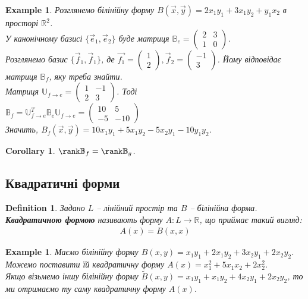 \documentclass[a4paper, 10pt]{article}
\theoremstyle{theoremdd}
\newtheorem{definition}[theorem]{Definition}
\newtheorem{example}[theorem]{Example}
\newtheorem{corollary}[theorem]{Corollary}
\begin{document}
\begin{example}
Розглянемо білінійну форму $B(\vec{x},\vec{y}) = 2x_1y_1 + 3x_1y_2 + y_1x_2$ в просторі $\mathbb{R}^2$.\\
У канонічному базисі $\{\vec{e}_1,\vec{e}_2\}$ буде матриця $\mathbb{B}_e = \begin{pmatrix}
2 & 3 \\
1 & 0
\end{pmatrix}$.\\
Розглянемо базис $\{ \vec{f}_1, \vec{f}_1 \}$, де $\vec{f_1} = \begin{pmatrix}
1 \\ 2
\end{pmatrix}, \vec{f}_2 = \begin{pmatrix}
-1 \\ 3
\end{pmatrix}$. Йому відповідає матриця $\mathbb{B}_f$, яку треба знайти.\\
Матриця $\mathbb{U}_{f \to e} = \begin{pmatrix}
1 & -1 \\
2 & 3
\end{pmatrix}$. Тоді\\
$\mathbb{B}_f = \mathbb{U}^T_{f \to e} \mathbb{B}_e \mathbb{U}_{f \to e} = \begin{pmatrix}
10 & 5 \\
-5 & -10
\end{pmatrix}$\\
Значить, $B_f(\vec{x},\vec{y}) = 10x_1y_1 + 5x_1y_2 - 5x_2y_1 - 10y_1y_2$.
\end{example}

\begin{corollary}
$\rank \mathbb{B}_f = \rank \mathbb{B}_g$.
\end{corollary}

\subsection{Квадратичні форми}
\begin{definition}
Задано $L$ -- лінійний простір та $B$ -- білінійна форма.\\
\textbf{Квадратичною формою} називають форму $A \colon L \to \mathbb{R}$, що приймає такий вигляд:
\begin{align*}
A(x) = B(x,x)
\end{align*}
\end{definition}

\begin{example}
Маємо білінійну форму $B(x,y) = x_1y_1 + 2x_1y_2 + 3x_2y_1 + 2x_2y_2$. Можемо поставити їй квадратичну форму $A(x) = x_1^2 + 5x_1x_2 + 2x_2^2$.\\
Якщо візьмемо іншу білінійну форму $\widetilde{B}(x,y) = x_1y_1 + x_1y_2 + 4x_2y_1 + 2x_2y_2$, то ми отримаємо ту саму квадратичну форму $A(x)$.
\end{example}
\end{document}
